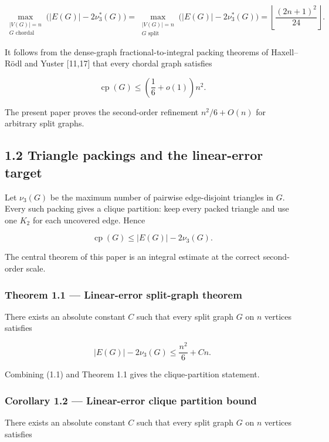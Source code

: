 \documentclass[
  american,
  11pt,
  a4paper,
]{article}
\begin{document}
\[
\max_{\substack{|V(G)|=n\\G\text{ chordal}}}
\bigl(|E(G)|-2\nu_3^*(G)\bigr)
=
\max_{\substack{|V(G)|=n\\G\text{ split}}}
\bigl(|E(G)|-2\nu_3^*(G)\bigr)
=
\left\lfloor\frac{(2n+1)^2}{24}\right\rfloor.
\]

It follows from the dense-graph fractional-to-integral packing theorems of Haxell--Rödl and Yuster {[}11,17{]} that every chordal graph satisfies

\[
\operatorname{cp}(G)
\le
\left(\frac16+o(1)\right)n^2.
\]

The present paper proves the second-order refinement \(n^2/6+O(n)\) for arbitrary split graphs.

\subsection{1.2 Triangle packings and the linear-error target}\label{triangle-packings-and-the-linear-error-target}

Let \(\nu_3(G)\) be the maximum number of pairwise edge-disjoint triangles in \(G\). Every such packing gives a clique partition: keep every packed triangle and use one \(K_2\) for each uncovered edge. Hence

\[
\operatorname{cp}(G)
\le
|E(G)|-2\nu_3(G).
\tag{1.1}
\]

The central theorem of this paper is an integral estimate at the correct second-order scale.

\subsubsection{Theorem 1.1 --- Linear-error split-graph theorem}\label{theorem-1.1-linear-error-split-graph-theorem}

There exists an absolute constant \(C\) such that every split graph \(G\) on \(n\) vertices satisfies

\[
\boxed{
|E(G)|-2\nu_3(G)
\le
\frac{n^2}{6}+Cn.
}
\tag{1.2}
\]

Combining (1.1) and Theorem 1.1 gives the clique-partition statement.

\subsubsection{Corollary 1.2 --- Linear-error clique partition bound}\label{corollary-1.2-linear-error-clique-partition-bound}

There exists an absolute constant \(C\) such that every split graph \(G\) on \(n\) vertices satisfies
\end{document}
